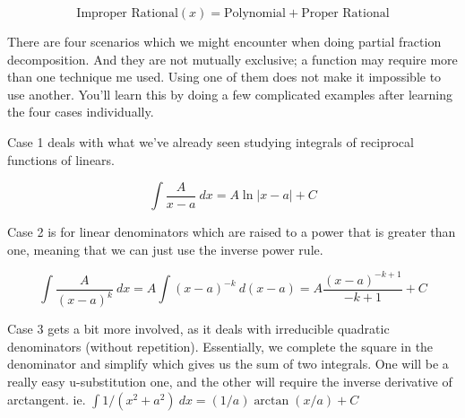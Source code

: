 \documentclass{article}
\begin{document}
\[\mbox{Improper Rational}(x)=\mbox{Polynomial}+\mbox{Proper Rational}\]

\newpage

There are four scenarios which we might encounter when doing partial fraction decomposition. And they are not mutually exclusive; a function may require more than one technique me used. Using one of them does not make it impossible to use another. You'll learn this by doing a few complicated examples after learning the four cases individually.

\vspace{10pt}

Case 1 deals with what we've already seen studying integrals of reciprocal functions of linears.

\begin{equation}
\int\frac{A}{x-a}\ dx=A\ln|x-a|+C
\end{equation}

\vspace{10pt}

Case 2 is for linear denominators which are raised to a power that is greater than one, meaning that we can just use the inverse power rule.

\begin{equation}
\int\frac{A}{(x-a)^k}\ dx=A\int(x-a)^{-k}\ d(x-a)=A\frac{(x-a)^{-k+1}}{-k+1}+C
\end{equation}

\newpage

Case 3 gets  a  bit more involved, as it deals with irreducible quadratic denominators (without repetition). Essentially, we complete the square in the denominator and simplify which gives us the sum of two integrals. One will be a really easy u-substitution one, and the other will require the inverse derivative of arctangent. ie. $\int1/(x^2+a^2)\ dx=(1/a)\arctan(x/a)+C$
\end{document}
